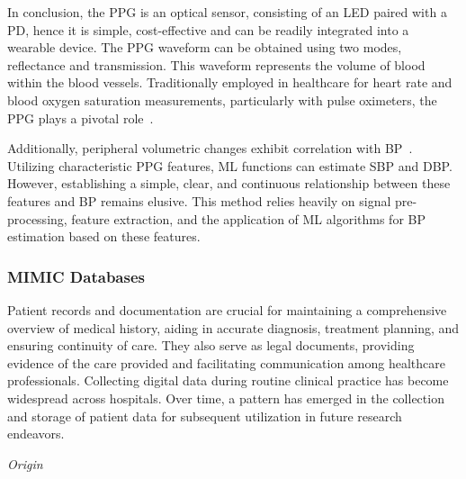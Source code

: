 \vspace{0.2cm}

In conclusion, the PPG is an optical sensor, consisting of an LED paired with a PD, hence it is simple, cost-effective and can be readily integrated into a wearable device.
The PPG waveform can be obtained using two modes, reflectance and transmission.
This waveform represents the volume of blood within the blood vessels.
Traditionally employed in healthcare for heart rate and blood oxygen saturation measurements, particularly with pulse oximeters, the PPG plays a pivotal role~\cite{allenPhotoplethysmographyItsApplication2007a}.

Additionally, peripheral volumetric changes exhibit correlation with BP~\cite{langewoutersPressurediameterRelationshipsSegments1986}.
Utilizing characteristic PPG features, ML functions can estimate SBP and DBP\@.
However, establishing a simple, clear, and continuous relationship between these features and BP remains elusive.
This method relies heavily on signal pre-processing, feature extraction, and the application of ML algorithms for BP estimation based on these features.

\subsubsection{MIMIC Databases}
\label{subsubsec:mimic}

Patient records and documentation are crucial for maintaining a comprehensive overview of medical history, aiding in accurate diagnosis, treatment planning, and ensuring continuity of care.
They also serve as legal documents, providing evidence of the care provided and facilitating communication among healthcare professionals.
Collecting digital data during routine clinical practice has become widespread across hospitals.
Over time, a pattern has emerged in the collection and storage of patient data for subsequent utilization in future research endeavors.

\vspace{0.2cm}
\textit{Origin}
\vspace{0.2cm}


